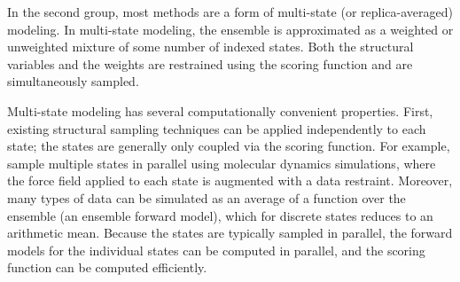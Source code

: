 \documentclass[../../main.tex]{subfiles}
\begin{document}
\begin{refsection}
	In the second group, most methods are a form of multi-state (or replica-averaged) modeling.
	In multi-state modeling, the ensemble is approximated as a weighted or unweighted mixture of some number of indexed states.
	Both the structural variables and the weights are restrained using the scoring function and are simultaneously sampled.


	Multi-state modeling has several computationally convenient properties.
	First, existing structural sampling techniques can be applied independently to each state; the states are generally only coupled via the scoring function.
	For example, \cite{bonomiMetadynamicMetainferenceEnhanced2016} sample multiple states in parallel using molecular dynamics simulations, where the force field applied to each state is augmented with a data restraint.
	Moreover, many types of data can be simulated as an average of a function over the ensemble (\ie an ensemble forward model), which for discrete states reduces to an arithmetic mean.
	Because the states are typically sampled in parallel, the forward models for the individual states can be computed in parallel, and the scoring function can be computed efficiently.



\end{refsection}
\end{document}
